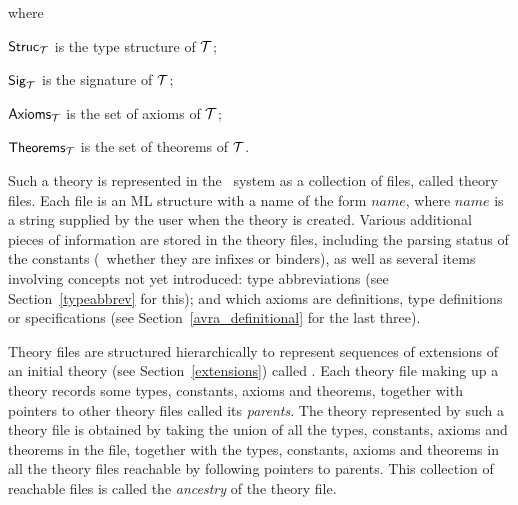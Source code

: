 \noindent where
\begin{myenumerate}
\item ${\sf Struc}_{\cal T}$ is
the type structure of ${\cal T}$;
\item ${\sf Sig}_{\cal T}$ is
the signature of ${\cal T}$;
\item ${\sf Axioms}_{\cal T}$ is
the set of axioms of ${\cal T}$;
\item ${\sf Theorems}_{\cal T}$ is the set of
theorems of ${\cal T}$.
\end{myenumerate}

Such a theory is represented  in the  \HOL\ system  as a  collection of files,
called theory files. Each  file is an ML structure
with a name  of the  form $name$, where
$name$ is a string supplied by the user when the theory is created.  Various additional pieces of
information are stored in the theory files, including the parsing status of the
constants (\eg\ whether they are infixes or binders), as well as several items
involving concepts not yet introduced: type abbreviations (see
Section~\ref{typeabbrev} for this); and which axioms are definitions, type
definitions or specifications (see Section~\ref{avra_definitional} for the last
three).

Theory files are structured hierarchically to represent sequences of
extensions of an initial theory (see Section~\ref{extensions}) called
. Each theory file making up a theory records some types, constants,
axioms and theorems, together with pointers to other theory files called its
{\it parents\/}.  The theory represented by such a theory file is obtained by
taking the union of all the types, constants, axioms and theorems in the file,
together with the types, constants, axioms and theorems in all the theory
files reachable by following pointers to parents. This collection of reachable
files is called the {\it ancestry\/}
of the theory file. 


